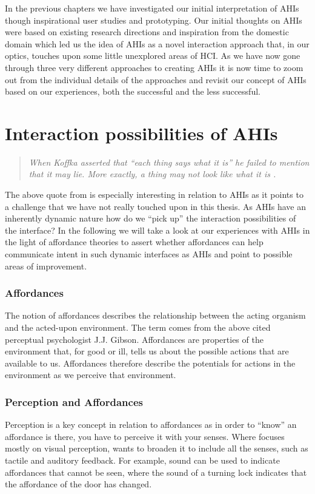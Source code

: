 In the previous chapters we have investigated our initial interpretation of AHIs though inspirational user studies and prototyping.
Our initial thoughts on AHIs were based on existing research directions and inspiration from the domestic domain which led us the idea of AHIs as a novel interaction approach that, in our optics, touches upon some little unexplored areas of HCI.  
As we have now gone through three very different approaches to creating AHIs it is now time to zoom out from the individual details of the approaches and revisit our concept of AHIs based on our experiences, both the successful and the less successful.

\section{Interaction possibilities of AHIs}
\begin{quotation}
\emph{When Koffka asserted that ``each thing says what it is'' he failed to mention that it may lie. More exactly, a thing may not look like what it is \citep{gibson1979ecological}.}
\end{quotation}
The above quote from \citeauthor{gibson1979ecological} is especially interesting in relation to AHIs as it points to a challenge that we have not really touched upon in this thesis.
As AHIs have an inherently dynamic nature how do we ``pick up'' the interaction possibilities of the interface? 
In the following we will take a look at our experiences with AHIs in the light of affordance theories to assert whether affordances can help communicate intent in such dynamic interfaces as AHIs and point to possible areas of improvement.

\subsubsection{Affordances}
The notion of affordances describes the relationship between the acting organism and the acted-upon environment.
The term comes from the above cited perceptual psychologist J.J. Gibson.
Affordances are properties of the environment that, for good or ill, tells us about the possible actions that are available to us.
Affordances therefore describe the potentials for actions in the environment as we perceive that environment.  

\subsubsection{Perception and Affordances}
Perception is a key concept in relation to affordances as in order to ``know'' an affordance is there, you have to perceive it with your senses. Where \citet{gibson1979ecological} focuses mostly on visual perception, \citet{gaver1991technology} wants to broaden it to include all the senses, such as tactile and auditory feedback.
For example, sound can be used to indicate affordances that cannot be seen, where the sound of a turning lock indicates that the affordance of the door has changed.

